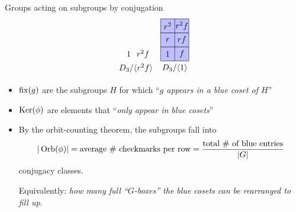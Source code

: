 \documentclass[8pt]{beamer}
\begin{document}
\begin{frame}{Groups acting on subgroups by conjugation}
\[\begin{tikzpicture}[scale=.6]
\begin{scope}[shift={(11,0)}]
      \node at (.5,.5) {$1$}; \node at (1.5,.5) {$r^2f$};
      \node at (1,-.5) {$D_3/\<r^2f\>$};
    \end{scope}
    \begin{scope}[shift={(13.75,0)}]
      \draw[thin,fill=boxBlue] (0,2) rectangle (2,3);
      \draw[thin,fill=boxBlue] (0,1) rectangle (2,2);
      \draw[thin,fill=boxBlue] (0,0) rectangle (2,1);
      \draw[thin] (1,0) to (1,3);
      \node at (.5,2.5) {$r^2$}; \node at (1.5,2.5) {$r^2f$};
      \node at (.5,1.5) {$r$}; \node at (1.5,1.5) {$rf$};
      \node at (.5,.5) {$1$}; \node at (1.5,.5) {$f$};
      \node at (1,-.5) {$D_3/\<1\>$};
    \end{scope}
  \end{tikzpicture}
  \]
  
  \begin{itemize}
  \item $\operatorname{fix}(g)$ are the subgroups $H$ for which ``\emph{$g$ appears
    in a blue coset of $H$}'' \smallskip
  \item $\operatorname{Ker}(\phi)$ are elements that ``\emph{only appear in blue
    cosets}'' \smallskip
  \item By the orbit-counting theorem, the subgroups fall into
    \[
    |\operatorname{Orb}(\phi)|=\text{average \# checkmarks per row}
    =\frac{\text{total \# of blue entries}}{|G|}
    \]
    conjugacy classes. \medskip
    
    Equivalently: \emph{how many full ``$G$-boxes'' the
      blue cosets can be rearranged to fill up.}
  \end{itemize}
  
\end{frame}

\end{document}
